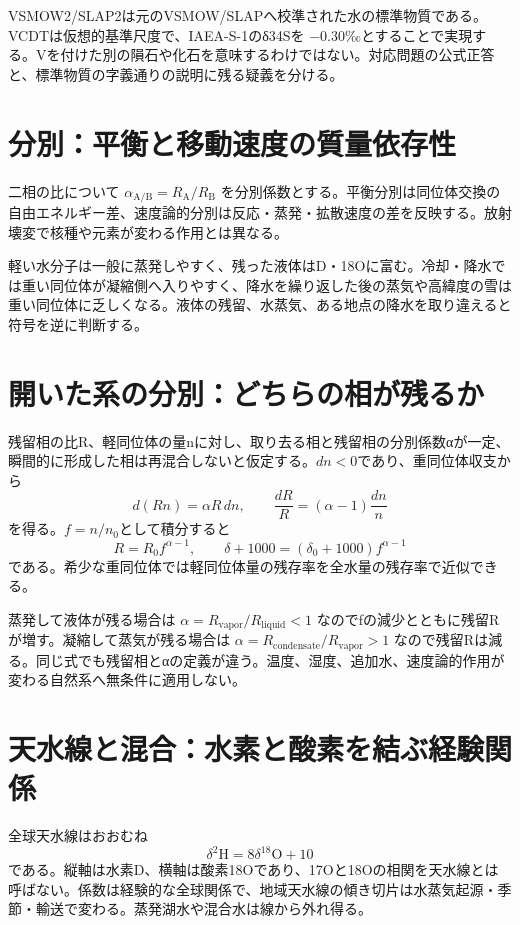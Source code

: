 VSMOW2/SLAP2は元のVSMOW/SLAPへ校準された水の標準物質である\cite{iso_vsmow2}。VCDTは仮想的基準尺度で、IAEA-S-1のδ34Sを \(-0.30\)‰とすることで実現する\cite{iso_vcdt}。Vを付けた別の隕石や化石を意味するわけではない。対応問題の公式正答と、標準物質の字義通りの説明に残る疑義を分ける。

\section{分別：平衡と移動速度の質量依存性}
\label{theory:isotope:fractionation}
二相の比について \(\alpha_{\mathrm{A/B}}=R_{\mathrm A}/R_{\mathrm B}\) を分別係数とする。平衡分別は同位体交換の自由エネルギー差、速度論的分別は反応・蒸発・拡散速度の差を反映する。放射壊変で核種や元素が変わる作用とは異なる。

軽い水分子は一般に蒸発しやすく、残った液体はD・18Oに富む。冷却・降水では重い同位体が凝縮側へ入りやすく、降水を繰り返した後の蒸気や高緯度の雪は重い同位体に乏しくなる\cite{iso_oxygen}。液体の残留、水蒸気、ある地点の降水を取り違えると符号を逆に判断する。

\section{開いた系の分別：どちらの相が残るか}
\label{theory:isotope:rayleigh}
残留相の比R、軽同位体の量nに対し、取り去る相と残留相の分別係数αが一定、瞬間的に形成した相は再混合しないと仮定する。\(dn<0\)であり、重同位体収支から
\[
 d(Rn)=\alpha R\,dn,\qquad
 \frac{dR}{R}=(\alpha-1)\frac{dn}{n}
\]
を得る。\(f=n/n_0\)として積分すると
\[
 R=R_0f^{\alpha-1},\qquad
 \delta+1000=(\delta_0+1000)f^{\alpha-1}
\]
である。希少な重同位体では軽同位体量の残存率を全水量の残存率で近似できる。

蒸発して液体が残る場合は \(\alpha=R_{\mathrm{vapor}}/R_{\mathrm{liquid}}<1\) なのでfの減少とともに残留Rが増す。凝縮して蒸気が残る場合は \(\alpha=R_{\mathrm{condensate}}/R_{\mathrm{vapor}}>1\) なので残留Rは減る。同じ式でも残留相とαの定義が違う。温度、湿度、追加水、速度論的作用が変わる自然系へ無条件に適用しない。

\section{天水線と混合：水素と酸素を結ぶ経験関係}
\label{theory:isotope:meteoric}
全球天水線はおおむね
\[
 \delta^2\mathrm H=8\delta^{18}\mathrm O+10
\]
である。縦軸は水素D、横軸は酸素18Oであり、17Oと18Oの相関を天水線とは呼ばない。係数は経験的な全球関係で、地域天水線の傾き切片は水蒸気起源・季節・輸送で変わる。蒸発湖水や混合水は線から外れ得る\cite{gc_meteoric}。

